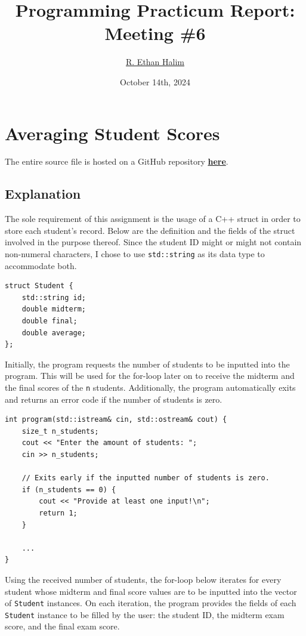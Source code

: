 \documentclass[12pt]{article}
\title{Programming Practicum Report:\\Meeting \#6}
\author{\href{https://github.com/avaxar}{R. Ethan Halim}}
\date{October 14th, 2024}
\begin{document}
\maketitle

\section{Averaging Student Scores}
The entire source file is hosted on a GitHub repository \href{https://github.com/avaxar/uni-practica-1/tree/main/week_6/01_student_scores}{\textbf{here}}.

\subsection{Explanation}

The sole requirement of this assignment is the usage of a C++ struct in order to store each student's record. Below are the definition and the fields of the struct involved in the purpose thereof. Since the student ID might or might not contain non-numeral characters, I chose to use \texttt{std::string} as its data type to accommodate both.

\begin{verbatim}
struct Student {
    std::string id;
    double midterm;
    double final;
    double average;
};
\end{verbatim}

Initially, the program requests the number of students to be inputted into the program. This will be used for the for-loop later on to receive the midterm and the final scores of the \texttt{n} students. Additionally, the program automatically exits and returns an error code if the number of students is zero.

\begin{verbatim}
int program(std::istream& cin, std::ostream& cout) {
    size_t n_students;
    cout << "Enter the amount of students: ";
    cin >> n_students;

    // Exits early if the inputted number of students is zero.
    if (n_students == 0) {
        cout << "Provide at least one input!\n";
        return 1;
    }

    ...
}
\end{verbatim}

Using the received number of students, the for-loop below iterates for every student whose midterm and final score values are to be inputted into the vector of \texttt{Student} instances. On each iteration, the program provides the fields of each \texttt{Student} instance to be filled by the user: the student ID, the midterm exam score, and the final exam score.
\end{document}
